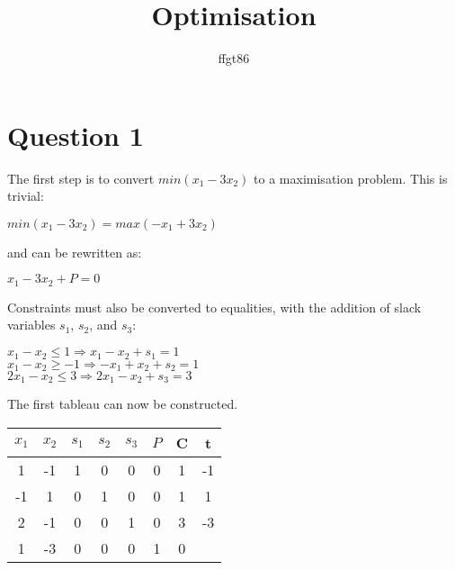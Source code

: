 \documentclass[11pt]{article} %
\title{Optimisation}
\author{ffgt86}
\begin{document}
\maketitle

\section*{Question 1}

The first step is to convert $min(x_1 - 3x_2)$ to a maximisation problem. This is trivial:

\begin{center}

$min(x_1 - 3x_2) = max(-x_1 + 3x_2)$

\end{center}

and can be rewritten as:

\begin{center}

$x_1 - 3x_2 + P = 0$

\end{center}

Constraints must also be converted to equalities, with the addition of slack variables $s_1$, $s_2$, and $s_3$:

\begin{center}

$x_1 - x_2 \leq 1 \Rightarrow x_1 - x_2 + s_1 = 1$ \\
$x_1 - x_2 \geq -1 \Rightarrow -x_1 + x_2 + s_2 = 1$ \\
$2x_1 - x_2 \leq 3 \Rightarrow 2x_1 - x_2 + s_3 = 3$ 

\end{center}

The first tableau can now be constructed.

\begin{center}

\begin{tabular}{ c c c c c c | c | c }
  $x_1$ & $x_2$ & $s_1$ & $s_2$ & $s_3$ & $P$ & C & t \\ \hline
  1 & -1 & 1 & 0 & 0 & 0 & 1 & -1\\
  -1 & 1 & 0 & 1 & 0 & 0 & 1 & 1\\
  2 & -1 & 0  & 0 & 1 & 0 & 3 & -3\\ \hline
  1 & -3 & 0 & 0 & 0 & 1 & 0 \\
\end{tabular}

\end{center}
\end{document}
